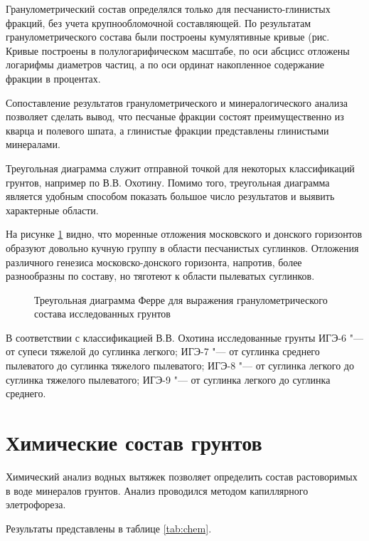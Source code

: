 Гранулометрический состав определялся только для песчанисто-глинистых фракций, без учета крупнообломочной составляющей.
По результатам гранулометрического состава были построены кумулятивные кривые (рис. %
Кривые построены в полулогарифическом масштабе, 
по оси абсцисс отложены логарифмы диаметров частиц, 
а по оси ординат накопленное содержание фракции в процентах.



Сопоставление результатов гранулометрического и минералогического анализа позволяет сделать вывод, 
что песчаные фракции состоят преимущественно из кварца и полевого шпата, 
а глинистые фракции представлены глинистыми минералами.

Треугольная диаграмма служит отправной точкой для некоторых классификаций грунтов, например по В.\;В. Охотину.
Помимо того, треугольная диаграмма является удобным способом показать большое число результатов и выявить характерные области.

На рисунке \ref{Fig:Ferre} видно, что моренные отложения московского и донского горизонтов образуют довольно кучную группу в области песчанистых суглинков.
Отложения различного генезиса московско-донского горизонта, напротив, более разнообразны по составу, но тяготеют к области 
пылеватых суглинков.

\begin{figure}[ht]
    \centering
    
    \caption{Треугольная диаграмма Ферре для выражения гранулометрического состава исследованных грунтов}
    \label{Fig:Ferre}
\end{figure}

 В соответствии с классификацией В.\;В. Охотина исследованные грунты 
 ИГЭ-6 "--- от супеси тяжелой до суглинка легкого;
 ИГЭ-7 "--- от суглинка среднего пылеватого до суглинка тяжелого пылеватого;
 ИГЭ-8 "--- от суглинка легкого до суглинка тяжелого пылеватого;
 ИГЭ-9 "--- от суглинка легкого до суглинка среднего.

 
\section{Химические состав грунтов}

Химический анализ водных вытяжек позволяет определить состав растоворимых в воде минералов грунтов.
Анализ проводился методом капиллярного элетрофореза. 

Результаты представлены в таблице \ref{tab:chem}.

